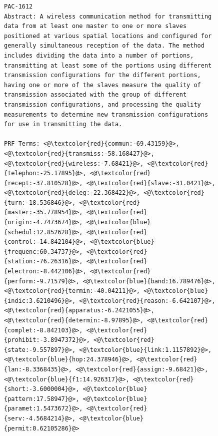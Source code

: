 \begin{figure}[htpb]
\begin{framed}
\vspace*{-2ex}
  \centering
 \begin{lstlisting}[basicstyle=\tiny\ttfamily , linewidth=\columnwidth,breaklines=true] 
PAC-1612
Abstract: A wireless communication method for transmitting data from at least one master to one or more slaves positioned at various spatial locations and configured for generally simultaneous reception of the data. The method includes dividing the data into a number of portions, transmitting at least some of the portions using different transmission configurations for the different portions, having one or more of the slaves measure the quality of transmission associated with the group of different transmission configurations, and processing the quality measurements to determine new transmission configurations for use in transmitting the data.

PRF Terms: <@\textcolor{red}{commun:-69.43159}@>, <@\textcolor{red}{transmiss:-58.168427}@>, <@\textcolor{red}{wireless:-7.68421}@>, <@\textcolor{red}{telephon:-25.17895}@>, <@\textcolor{red}{recept:-37.810528}@>, <@\textcolor{red}{slave:-31.0421}@>, <@\textcolor{red}{deleg:-22.368422}@>, <@\textcolor{red}{turn:-18.536846}@>, <@\textcolor{red}{master:-35.778954}@>, <@\textcolor{red}{origin:-4.7473674}@>, <@\textcolor{blue}{schedul:12.852628}@>, <@\textcolor{red}{control:-14.842104}@>, <@\textcolor{blue}{frequenc:60.34737}@>, <@\textcolor{red}{station:-76.26316}@>, <@\textcolor{red}{electron:-8.442106}@>, <@\textcolor{red}{perform:-9.71579}@>, <@\textcolor{blue}{band:16.789476}@>, <@\textcolor{red}{termin:-40.04211}@>, <@\textcolor{blue}{indic:3.6210496}@>, <@\textcolor{red}{reason:-6.642107}@>, <@\textcolor{red}{apparatus:-6.2421055}@>, <@\textcolor{red}{determin:-8.97895}@>, <@\textcolor{red}{complet:-8.842103}@>, <@\textcolor{red}{prohibit:-3.8947372}@>, <@\textcolor{red}{state:-9.557897}@>, <@\textcolor{blue}{link:1.1157892}@>, <@\textcolor{blue}{hop:24.378946}@>, <@\textcolor{red}{lan:-8.3368435}@>, <@\textcolor{red}{assign:-9.68421}@>, <@\textcolor{blue}{f1:14.926317}@>, <@\textcolor{red}{short:-3.6000004}@>, <@\textcolor{blue}{pattern:17.58947}@>, <@\textcolor{blue}{paramet:1.5473672}@>, <@\textcolor{red}{serv:-4.5684214}@>, <@\textcolor{blue}{permit:0.62105286}@>


\end{lstlisting}
\end{framed}
\end{figure}
